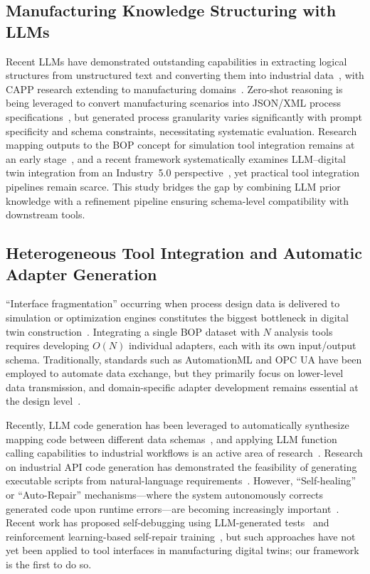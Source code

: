 \documentclass[conference]{IEEEtran}
\begin{document}
\subsection{Manufacturing Knowledge Structuring with LLMs}

Recent LLMs have demonstrated outstanding capabilities in extracting logical structures from unstructured text and converting them into industrial data~\cite{b6}, with CAPP research extending to manufacturing domains~\cite{b7}. Zero-shot reasoning is being leveraged to convert manufacturing scenarios into JSON/XML process specifications~\cite{b8}, but generated process granularity varies significantly with prompt specificity and schema constraints, necessitating systematic evaluation. Research mapping outputs to the BOP concept for simulation tool integration remains at an early stage~\cite{b9}, and a recent framework systematically examines LLM--digital twin integration from an Industry~5.0 perspective~\cite{b16}, yet practical tool integration pipelines remain scarce. This study bridges the gap by combining LLM prior knowledge with a refinement pipeline ensuring schema-level compatibility with downstream tools.

\subsection{Heterogeneous Tool Integration and Automatic Adapter Generation}

``Interface fragmentation'' occurring when process design data is delivered to simulation or optimization engines constitutes the biggest bottleneck in digital twin construction~\cite{b10}. Integrating a single BOP dataset with $N$ analysis tools requires developing $O(N)$ individual adapters, each with its own input/output schema. Traditionally, standards such as AutomationML and OPC UA have been employed to automate data exchange, but they primarily focus on lower-level data transmission, and domain-specific adapter development remains essential at the design level~\cite{b11}.

Recently, LLM code generation has been leveraged to automatically synthesize mapping code between different data schemas~\cite{b12}, and applying LLM function calling capabilities to industrial workflows is an active area of research~\cite{b17}. Research on industrial API code generation has demonstrated the feasibility of generating executable scripts from natural-language requirements~\cite{b13}. However, ``Self-healing'' or ``Auto-Repair'' mechanisms---where the system autonomously corrects generated code upon runtime errors---are becoming increasingly important~\cite{b14}. Recent work has proposed self-debugging using LLM-generated tests~\cite{b18} and reinforcement learning-based self-repair training~\cite{b19}, but such approaches have not yet been applied to tool interfaces in manufacturing digital twins; our framework is the first to do so.
\end{document}
